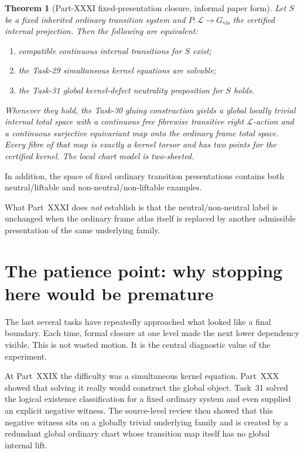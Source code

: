 \documentclass[11pt,a4paper]{article}
\newtheorem{theorem}{Theorem}
\theoremstyle{definition}
\newcommand{\Lift}{\mathcal{L}}
\newcommand{\Gvis}{G_{\mathrm{vis}}}
\begin{document}
\begin{theorem}[Part-XXXI fixed-presentation closure, informal paper form]
Let $S$ be a fixed inherited ordinary transition system and $P:\Lift\to\Gvis$ the certified internal projection.  Then the following are equivalent:
\begin{enumerate}[leftmargin=*]
 \item compatible continuous internal transitions for $S$ exist;
 \item the Task-29 simultaneous kernel equations are solvable;
 \item the Task-31 global kernel-defect neutrality proposition for $S$ holds.
\end{enumerate}
Whenever they hold, the Task-30 gluing construction yields a global locally trivial internal total space with a continuous free fibrewise transitive right $\Lift$-action and a continuous surjective equivariant map onto the ordinary frame total space.  Every fibre of that map is exactly a kernel torsor and has two points for the certified kernel.  The local chart model is two-sheeted.
\end{theorem}

In addition, the space of fixed ordinary transition presentations contains both neutral/liftable and non-neutral/non-liftable examples.

What Part~XXXI does \emph{not} establish is that the neutral/non-neutral label is unchanged when the ordinary frame atlas itself is replaced by another admissible presentation of the same underlying family.

\section{The patience point: why stopping here would be premature}\label{sec:patience}

The last several tasks have repeatedly approached what looked like a final boundary.  Each time, formal closure at one level made the next lower dependency visible.  This is not wasted motion.  It is the central diagnostic value of the experiment.

At Part~XXIX the difficulty was a simultaneous kernel equation.  Part~XXX showed that solving it really would construct the global object.  Task~31 solved the logical existence classification for a fixed ordinary system and even supplied an explicit negative witness.  The source-level review then showed that this negative witness sits on a globally trivial underlying family and is created by a redundant global ordinary chart whose transition map itself has no global internal lift.
\end{document}

